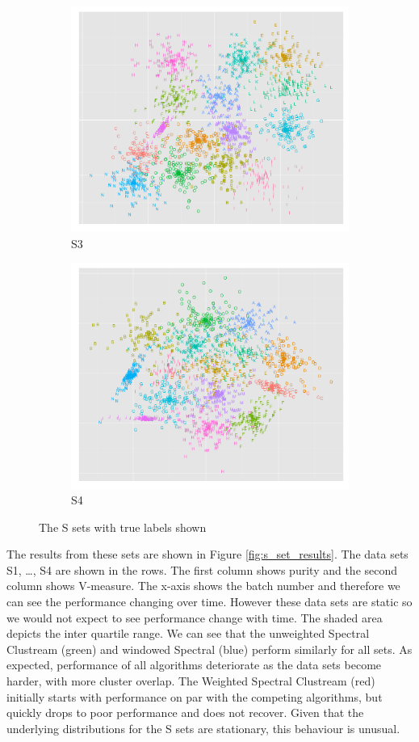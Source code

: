 \begin{figure}[H]
\begin{subfigure}{.4\textwidth}
  \centering
  \includegraphics[width=.8\linewidth]{s_set/s_set_3_truth.png}
  \caption{S3}
\end{subfigure}%
\begin{subfigure}{.4\textwidth}
  \centering
  \includegraphics[width=.8\linewidth]{s_set/s_set_4_truth.png}
  \caption{S4}
\end{subfigure}
\caption{The S sets with true labels shown}
\label{fig:s_set_truth}
\end{figure}


The results from these sets are shown in Figure \ref{fig:s_set_results}. The data sets S1, \ldots, S4 are shown in the rows. The first column shows purity and the second column shows V-measure. The x-axis shows the batch number and therefore we can see the performance changing over time. However these data sets are static so we would not expect to see performance change with time. The shaded area depicts the inter quartile range. We can see that the unweighted Spectral Clustream (green) and windowed Spectral (blue) perform similarly for all sets. As expected, performance of all algorithms deteriorate as the data sets become harder, with more cluster overlap.  The Weighted Spectral Clustream (red) initially starts with performance on par with the competing algorithms, but quickly drops to poor performance and does not recover. Given that the underlying distributions for the S sets are stationary, this behaviour is unusual.  

